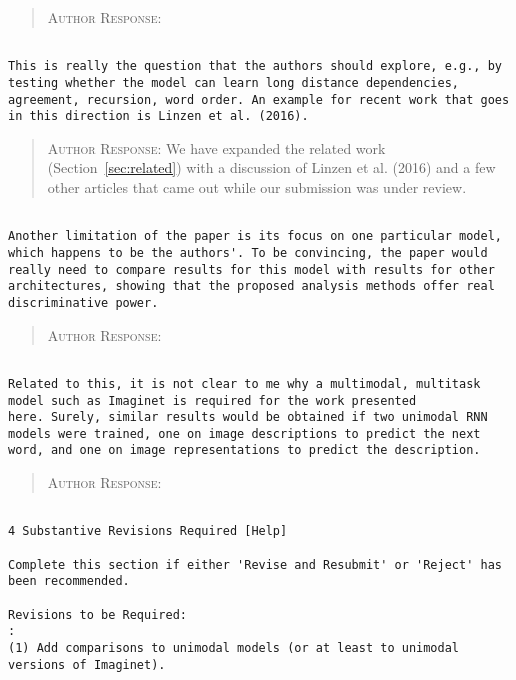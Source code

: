 \begin{quote}
\textsc{Author Response:}  
\end{quote}
\begin{verbatim}

This is really the question that the authors should explore, e.g., by
testing whether the model can learn long distance dependencies,
agreement, recursion, word order. An example for recent work that goes
in this direction is Linzen et al. (2016).
\end{verbatim}  
\begin{quote}
\textsc{Author Response:} We have expanded the related work 
(Section~\ref{sec:related}) with a discussion of Linzen et al. (2016) 
and a few other articles that came out while our submission was under review.
\end{quote}
\begin{verbatim}

Another limitation of the paper is its focus on one particular model,
which happens to be the authors'. To be convincing, the paper would
really need to compare results for this model with results for other
architectures, showing that the proposed analysis methods offer real
discriminative power.
\end{verbatim}  
\begin{quote}
\textsc{Author Response:}  
\end{quote}
\begin{verbatim}

Related to this, it is not clear to me why a multimodal, multitask
model such as Imaginet is required for the work presented
here. Surely, similar results would be obtained if two unimodal RNN
models were trained, one on image descriptions to predict the next
word, and one on image representations to predict the description.
\end{verbatim}  
\begin{quote}
\textsc{Author Response:}  
\end{quote}
\begin{verbatim}

4 Substantive Revisions Required [Help]

Complete this section if either 'Revise and Resubmit' or 'Reject' has
been recommended.

Revisions to be Required:
: 
(1) Add comparisons to unimodal models (or at least to unimodal
versions of Imaginet).
\end{verbatim}  
